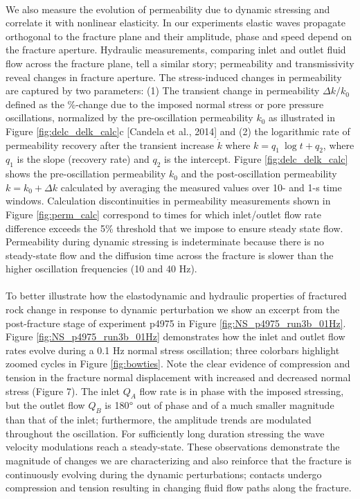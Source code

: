 \documentclass[letterpaper,10pt]{article}
\begin{document}
\paragraph{}
We also measure the evolution of permeability due to dynamic stressing and correlate it with nonlinear elasticity. In our experiments elastic waves propagate orthogonal to the fracture plane and their amplitude, phase and speed depend on the fracture aperture. Hydraulic measurements, comparing inlet and outlet fluid flow across the fracture plane, tell a similar story; permeability and transmissivity reveal changes in fracture aperture.
The stress-induced changes in permeability are captured by two parameters: (1) The transient change in permeability $ \Delta k/k_0 $ defined as the \%-change due to the imposed normal stress or pore pressure oscillations, normalized by the pre-oscillation permeability $ k_0 $ as illustrated in Figure \ref{fig:delc_delk_calc}c [Candela et al., 2014] and (2) the logarithmic rate of permeability recovery after the transient increase $ \dot k $ where $ k = q_1\ \log{t} + q_2 $, where $q_1$ is the slope (recovery rate) and $q_2$ is the intercept.
Figure \ref{fig:delc_delk_calc} shows the pre-oscillation permeability $ k_0 $ and the post-oscillation permeability $ k = k_0 + \Delta k $ calculated by averaging the measured values over 10- and 1-s time windows. Calculation discontinuities in permeability measurements shown in Figure \ref{fig:perm_calc} correspond to times for which inlet/outlet flow rate difference exceeds the 5\% threshold that we impose to ensure steady state flow. Permeability during dynamic stressing is indeterminate because there is no steady-state flow and the diffusion time across the fracture is slower than the higher oscillation frequencies (10 and  40 Hz). 

\paragraph{}
To better illustrate how the elastodynamic and hydraulic properties of fractured rock change in response to dynamic perturbation we show an excerpt from the post-fracture stage of experiment p4975 in Figure \ref{fig:NS_p4975_run3b_01Hz}.
Figure  \ref{fig:NS_p4975_run3b_01Hz} demonstrates how the inlet and outlet flow rates evolve during a 0.1 Hz normal stress oscillation; three colorbars highlight zoomed cycles in Figure \ref{fig:bowties}. Note the clear evidence of compression and tension in the fracture normal displacement with increased and decreased normal stress (Figure 7). The inlet $ Q_A $ flow rate is in phase with the imposed stressing, but the outlet flow $ Q_B $ is 180$\degree$ out of phase and of a much smaller magnitude than that of the inlet;  furthermore, the amplitude trends are modulated throughout the oscillation. For sufficiently long duration stressing the wave velocity modulations reach a steady-state. These observations demonstrate the magnitude of changes we are characterizing and also reinforce that the fracture is continuously evolving during the dynamic perturbations; contacts undergo compression and tension resulting in changing fluid flow paths along the fracture.
\end{document}
